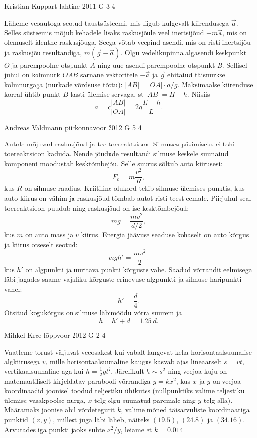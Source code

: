 \documentclass[11pt]{article}
\begin{document}
{%
{Kristian Kuppart} %
{lahtine} %
{2011} %
{G 3} %
{4} %
{

\ifSolution
Läheme veoautoga seotud taustsüsteemi, mis liigub kulgevalt kiirendusega $\vec a$. Selles süsteemis mõjub
kehadele lisaks raskusjõule veel inertsijõud $-m\vec a$, mis on olemuselt identne raskusjõuga.
Seega võtab veepind asendi, mis on risti inertsijõu ja raskusjõu resultandiga, $m(\vec g-\vec a)$.
Olgu vedelikupinna algasendi keskpunkt $O$ ja parempoolne otspunkt $A$ ning uue asendi parempoolne otspunkt $B$.
Sellisel juhul on kolmnurk $OAB$ sarnane vektoritele $-\vec a$ ja $\vec g$ ehitatud täisnurkse kolmnurgaga (nurkade võrdsuse tõttu):
$|AB|=|OA|\cdot a/g$. Maksimaalse kiirenduse korral ühtib punkt $B$ kasti ülemise servaga, st $|AB|=H-h$. Niisiis
\[
a=g\frac{|AB|}{|OA|}=2g\frac {H-h}{L}.
\]
\fi
}

{Andreas Valdmann} %
{piirkonnavoor} %
{2012} %
{G 5} %
{4} %
{

\ifSolution
Autole mõjuvad raskusjõud ja tee toereaktsioon. Silmuses püsimiseks ei tohi
toereaktsioon kaduda. Nende jõudude resultandi silmuse keskele
suunatud komponent moodustab kesktõmbejõu. Selle suurus sõltub auto kiirusest:
\[F_c=m\frac{v^2}{R},\]
kus $R$ on silmuse raadius.
Kriitiline olukord tekib silmuse ülemises punktis, kus auto kiirus on vähim ja
raskusjõud tõmbab autot risti teest eemale. Piirjuhul seal
toereaktsioon puudub ning raskusjõud on ise kesktõmbejõud:
\[ mg=\frac{mv^2}{d/2},\]
kus $m$ on auto mass ja $v$ kiirus.
Energia jäävuse seaduse kohaselt on auto kõrgus ja kiirus otseselt seotud:
\[ mgh'=\frac{mv^2}{2},\]
kus $h'$ on algpunkti ja uuritava punkti kõrguste vahe. Saadud võrrandit 
eelmisega läbi jagades saame vajaliku kõrguste erinevuse algpunkti ja silmuse 
haripunkti vahel:
\[ h'=\frac{d}{4}.\]
Otsitud kogukõrgus on silmuse läbimõõdu võrra suurem ja
\[ h=h'+d=\SI{1,25}{d}.\]
\fi
}

{Mihkel Kree} %
{lõppvoor} %
{2012} %
{G 2} %
{4} %
{

\ifSolution
Vaatleme torust väljuvat veeosakest kui vabalt langevat keha horisontaalsuunalise algkiirusega $v$, mille horisontaalsuunaline kaugus kasvab ajas lineaarselt $s=vt$, vertikaalsuunaline aga kui $h=\frac{1}{2}gt^2$. Järelikult $h\sim s^2$ ning veejoa kuju on matemaatiliselt kirjeldatav parabooli võrrandiga $y=kx^2$, kus $x$ ja $y$ on veejoa koordinaadid joonisel toodud teljestiku ühikutes (nullpunktiks valime teljestiku ülemise vasakpoolse nurga, $x$-telg olgu suunatud paremale ning $y$-telg alla). Määramaks joonise abil võrdetegurit $k$, valime mõned täisarvuliste koordinaatiga punktid $(x,y)$, millest juga läbi läheb, näiteks $(\num{19,5})$, $(\num{24,8})$ ja $(\num{34,16})$. Arvutades iga punkti jaoks suhte $x^2/y$, leiame et $k=\num{0.014}$. 
	
}}
\end{document}
